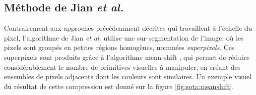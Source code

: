  \subsection{Méthode de Jian \textit{et al.}}
\label{sec:sota:jian}
Contrairement aux approches précédemment décrites qui travaillent à l'échelle du pixel,  l'algorithme de Jian \textit{et al.} \cite{jian2016interactive} utilise une sur-segmentation de l'image, où les pixels sont groupés en petites régions homogènes, nommées \emph{superpixels}. Ces superpixels sont produits grâce à l'algorithme mean-shift \cite{comaniciu2002mean}, qui permet de réduire considérablement le nombre de primitives visuelles à manipuler, en créant des ensembles de pixels adjacents dont les couleurs sont similaires. Un exemple visuel du résultat de cette compression est donné sur la figure \ref{fig:sota:meanshift}.


